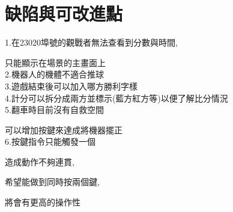\chapter{缺陷與可改進點}
1.在23020埠號的觀戰者無法查看到分數與時間,

只能顯示在場景的主畫面上\\

2.機器人的機體不適合推球\\

3.遊戲結束後可以加入哪方勝利字樣\\

4.計分可以拆分成兩方並標示(藍方紅方等)以便了解比分情況\\

5.翻車時目前沒有自救空間

可以增加按鍵來達成將機器擺正\\

6.按鍵指令只能觸發一個

造成動作不夠連貫,

希望能做到同時按兩個鍵,

將會有更高的操作性
\newpage